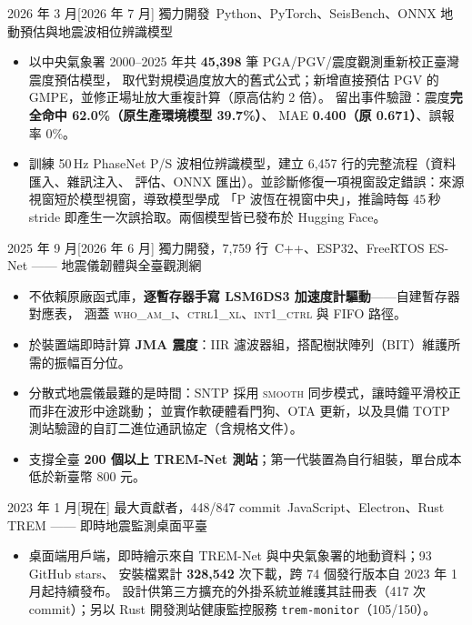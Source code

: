 \documentclass[zh]{resume}
\begin{document}
\newpage
\begin{projects}
  \project%
    {2026 年 3 月}[2026 年 7 月]%
    {獨力開發}%
    {\,Python、PyTorch、SeisBench、ONNX}%
    {地動預估與地震波相位辨識模型}%
    {\begin{itemize}
      \item 以中央氣象署 2000--2025 年共 \textbf{45,398} 筆 PGA/PGV/震度觀測重新校正臺灣震度預估模型，
        取代對規模過度放大的舊式公式；新增直接預估 PGV 的 GMPE，並修正場址放大重複計算（原高估約 2 倍）。
        留出事件驗證：震度\textbf{完全命中 62.0\%（原生產環境模型 39.7\%）}、
        MAE \textbf{0.400（原 0.671）}、誤報率 0\%。
      \item 訓練 50\,Hz PhaseNet P/S 波相位辨識模型，建立 6,457 行的完整流程（資料匯入、雜訊注入、
        評估、ONNX 匯出）。並診斷修復一項視窗設定錯誤：來源視窗短於模型視窗，導致模型學成
        「P 波恆在視窗中央」，推論時每 45\,秒 stride 即產生一次誤拾取。兩個模型皆已發布於 Hugging Face。
    \end{itemize}}

  \project%
    {2025 年 9 月}[2026 年 6 月]%
    {獨力開發，7,759 行}%
    {\,C++、ESP32、FreeRTOS}%
    {ES-Net —— 地震儀韌體與全臺觀測網}%
    {\begin{itemize}
      \item 不依賴原廠函式庫，\textbf{逐暫存器手寫 LSM6DS3 加速度計驅動}——自建暫存器對應表，
        涵蓋 \textsc{who\_am\_i}、\textsc{ctrl1\_xl}、\textsc{int1\_ctrl} 與 FIFO 路徑。
      \item 於裝置端即時計算 \textbf{JMA 震度}：IIR 濾波器組，搭配樹狀陣列（BIT）維護所需的振幅百分位。
      \item 分散式地震儀最難的是時間：SNTP 採用 \textsc{smooth} 同步模式，讓時鐘平滑校正而非在波形中途跳動；
        並實作軟硬體看門狗、OTA 更新，以及具備 TOTP 測站驗證的自訂二進位通訊協定（含規格文件）。
      \item 支撐全臺 \textbf{200 個以上 TREM-Net 測站}；第一代裝置為自行組裝，單台成本低於新臺幣 800 元。
    \end{itemize}}

  \project%
    {2023 年 1 月}[現在]%
    {最大貢獻者，448/847 commit}%
    {\,JavaScript、Electron、Rust}%
    {TREM —— 即時地震監測桌面平臺}%
    {\begin{itemize}
      \item 桌面端用戶端，即時繪示來自 TREM-Net 與中央氣象署的地動資料；93 GitHub stars、
        安裝檔累計 \textbf{328,542} 次下載，跨 74 個發行版本自 2023 年 1 月起持續發布。
        設計供第三方擴充的外掛系統並維護其註冊表（417 次 commit）；另以 Rust 開發測站健康監控服務
        \texttt{trem-monitor}（105/150）。
    \end{itemize}}


\end{projects}
\end{document}
